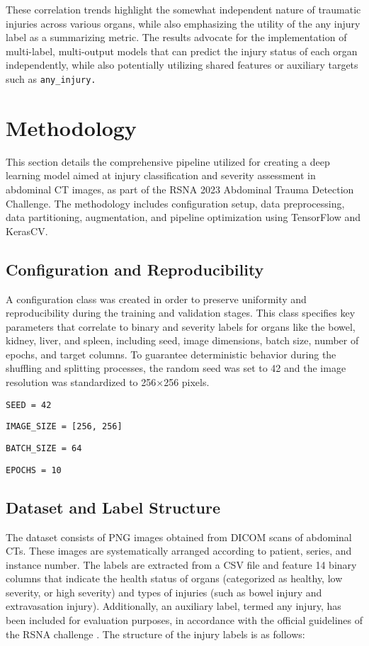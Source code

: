 \documentclass[a4paper,12pt]{article}
\begin{document}
These correlation trends highlight the somewhat independent nature of traumatic injuries across various organs, while also emphasizing the utility of the any injury label as a summarizing metric. The results advocate for the implementation of multi-label, multi-output models that can predict the injury status of each organ independently, while also potentially utilizing shared features or auxiliary targets such as \verb|any_injury.|

\section{Methodology}	
This section details the comprehensive pipeline utilized for creating a deep learning model aimed at injury classification and severity assessment in abdominal CT images, as part of the RSNA 2023 Abdominal Trauma Detection Challenge. The methodology includes configuration setup, data preprocessing, data partitioning, augmentation, and pipeline optimization using TensorFlow and KerasCV.
\subsection{Configuration and Reproducibility}
A configuration class was created in order to preserve uniformity and reproducibility during the training and validation stages. This class specifies key parameters that correlate to binary and severity labels for organs like the bowel, kidney, liver, and spleen, including seed, image dimensions, batch size, number of epochs, and target columns. To guarantee deterministic behavior during the shuffling and splitting processes, the random seed was set to 42 and the image resolution was standardized to 256×256 pixels.

\verb|SEED = 42|

\verb|IMAGE_SIZE = [256, 256]|

\verb|BATCH_SIZE = 64 |

\verb|EPOCHS = 10|
\subsection{Dataset and Label Structure}
The dataset consists of PNG images obtained from DICOM scans of abdominal CTs. These images are systematically arranged according to patient, series, and instance number. The labels are extracted from a CSV file and feature 14 binary columns that indicate the health status of organs (categorized as healthy, low severity, or high severity) and types of injuries (such as bowel injury and extravasation injury). Additionally, an auxiliary label, termed any injury, has been included for evaluation purposes, in accordance with the official guidelines of the RSNA challenge \cite{kaggle2023rsna}.
The structure of the injury labels is as follows:
\end{document}
